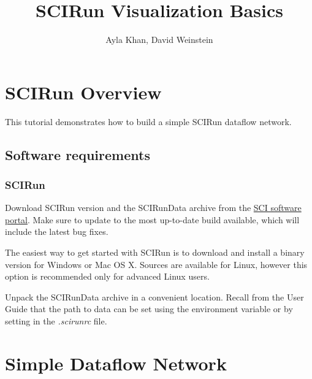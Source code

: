 \documentclass[fleqn,11pt,openany]{book}
\title{SCIRun Visualization Basics}
\author{Ayla Khan, David Weinstein}
\begin{document}


\maketitle


\chapter{SCIRun Overview} \label{overview}

\begin{introduction}
This tutorial demonstrates how to build a simple SCIRun dataflow network.
\end{introduction}

\section{Software requirements}

\subsection{SCIRun  \SCIRunVersion}

Download SCIRun version \SCIRunVersion and the SCIRunData archive from the
\href{http://www.scirun.org}{SCI software portal}.
Make sure to update to the most up-to-date build available, which will include
the latest bug fixes.

The easiest way to get started with SCIRun is to download and install
a binary version for Windows or Mac OS X.
Sources are available for Linux, however this option is recommended
only for advanced Linux users.

Unpack the SCIRunData archive in a convenient location.
Recall from the User Guide that the path to data can be set using the
 environment variable or by setting
 in the \emph{.scirunrc} file.


\chapter{Simple Dataflow Network}
\end{document}
